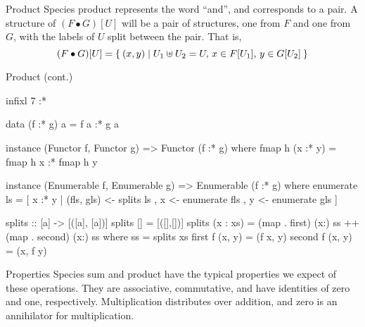 \documentclass{beamer}
\begin{document}
\begin{frame}{Product}
  Species product represents the word ``and'', and corresponds to a pair.  A structure of \( (F
  \bullet G)[U] \) will be a pair of structures, one from \( F \) and one from \( G \), with the
  labels of \( U \) split between the pair. That is,
  \[
    (F \bullet G)[U] = \Set{ (x, y) | U_1 \uplus U_2 = U,\, x \in F[U_1],\, y \in G[U_2] }
  \]
\end{frame}
\begin{frame}[fragile]{Product (cont.)}
  \begin{code}
infixl 7 :*

data (f :* g) a = f a :* g a

instance (Functor f, Functor g) => Functor (f :* g) where
  fmap h (x :* y) = fmap h x :* fmap h y

instance (Enumerable f, Enumerable g) => Enumerable (f :* g) where
  enumerate ls = [ x :* y
                 | (fls, gls) <- splits ls
                 , x <- enumerate fls
                 , y <- enumerate gls
                 ]

splits :: [a] -> [([a], [a])]
splits [] = [([],[])]
splits (x : xs) = (map . first) (x:) ss ++ (map . second) (x:) ss
  where ss = splits xs
        first f (x, y) = (f x, y)
        second f (x, y) = (x, f y)
  \end{code}
\end{frame}

\begin{frame}{Properties}
  Species sum and product have the typical properties we expect of these operations.  They are
  associative, commutative, and have identities of zero and one, respectively.  Multiplication
  distributes over addition, and zero is an annihilator for multiplication.
\end{frame}
\end{document}
